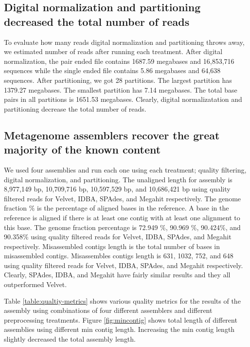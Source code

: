 \subsection *{Digital normalization and partitioning decreased the total number of reads } 
To evaluate how many reads digital normalization and partitioning throws away, we estimated number of reads after running each treatment. 
After digital normalization, the pair ended file contains 1687.59 megabases and 16,853,716 sequences  while the single ended file contains 5.86 megabases and 64,638 sequences. 
After partitioning, we got 28 partitions. The largest partition has 1379.27 megabases. The smallest partition has 7.14 megabases. The total base pairs in all partitions is 1651.53 megabases. 
Clearly, digital normalizatation and partitioning decrease the total number of reads.  

\subsection*{Metagenome assemblers recover the great majority of the known content}   
We  used four assemblies and run each one using each treatment; quality filtering, digital normalization, and partitioning. 
The unaligned length for assembly is 8,977,149 bp, 10,709,716 bp,  10,597,529 bp, and 10,686,421 bp using quality filtered reads for Velvet, IDBA, SPAdes, and Megahit respectively. 
The genome fraction \% is the percentage of aligned bases in the reference. A base in the reference is aligned if there is at least one contig with at least one alignment to this base. 
The genome fraction percentage is 72.949 \%, 90.969 \%, 90.424\%, and 90.358\%  using quality filtered reads for Velvet, IDBA, SPAdes, and Megahit respectively. 
Misassembled contigs length is the total number of bases in misassembled contigs.  Misassembles contigs length is 631, 1032, 752, and 648 using quality filtered reads for Velvet, IDBA, SPAdes, and Megahit respectively. 
Clearly, SPAdes, IDBA, and Megahit have fairly similar results and they all outperformed Velvet. 


Table \ref {table:qualtiy-metrics} shows various quality metrics for the results of the assembly using combinations of four different assemblers and different preprocessing treatments.
Figure \ref{fig:mincontig} shows total length of different assemblies using different min contig length. Increasing the min contig length slightly decreased the total assembly length. 

